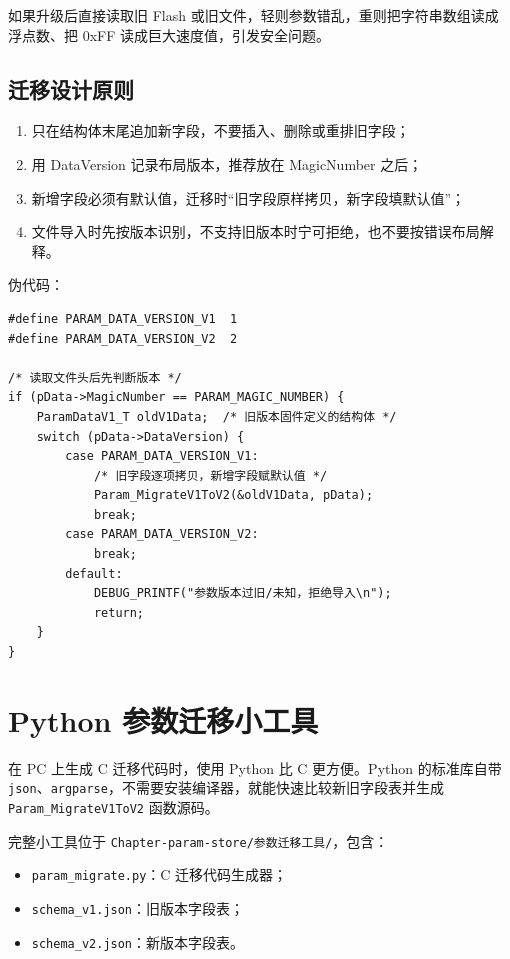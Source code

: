 如果升级后直接读取旧 Flash 或旧文件，轻则参数错乱，重则把字符串数组读成浮点数、把 0xFF 读成巨大速度值，引发安全问题。

\subsection{迁移设计原则}

\begin{enumerate}
\item 只在结构体末尾追加新字段，不要插入、删除或重排旧字段；
\item 用 DataVersion 记录布局版本，推荐放在 MagicNumber 之后；
\item 新增字段必须有默认值，迁移时“旧字段原样拷贝，新字段填默认值”；
\item 文件导入时先按版本识别，不支持旧版本时宁可拒绝，也不要按错误布局解释。
\end{enumerate}

伪代码：

\begin{lstlisting}[style=c]
#define PARAM_DATA_VERSION_V1  1
#define PARAM_DATA_VERSION_V2  2

/* 读取文件头后先判断版本 */
if (pData->MagicNumber == PARAM_MAGIC_NUMBER) {
    ParamDataV1_T oldV1Data;  /* 旧版本固件定义的结构体 */
    switch (pData->DataVersion) {
        case PARAM_DATA_VERSION_V1:
            /* 旧字段逐项拷贝，新增字段赋默认值 */
            Param_MigrateV1ToV2(&oldV1Data, pData);
            break;
        case PARAM_DATA_VERSION_V2:
            break;
        default:
            DEBUG_PRINTF("参数版本过旧/未知，拒绝导入\n");
            return;
    }
}
\end{lstlisting}

\section{Python 参数迁移小工具}

在 PC 上生成 C 迁移代码时，使用 Python 比 C 更方便。Python 的标准库自带 \texttt{json}、\texttt{argparse}，不需要安装编译器，就能快速比较新旧字段表并生成 \texttt{Param\_MigrateV1ToV2} 函数源码。

完整小工具位于 \texttt{Chapter-param-store/参数迁移工具/}，包含：

\begin{itemize}
\item \texttt{param\_migrate.py}：C 迁移代码生成器；
\item \texttt{schema\_v1.json}：旧版本字段表；
\item \texttt{schema\_v2.json}：新版本字段表。
\end{itemize}

